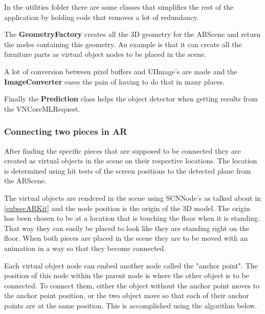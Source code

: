 In the utilities folder there are some classes that simplifies the rest of the application
by holding code that removes a lot of redundancy.

The \textbf{GeometryFactory} creates all the 3D geometry for the ARScene and return the nodes 
containing this geometry. An example is that it can create all the furniture parts as virtual object 
nodes to be placed in the scene.

A lot of conversion between pixel buffers and UIImage's are made and the \textbf{ImageConverter }
eases the pain of having to do that in many places.

Finally the \textbf{Prediction} class helps the object detector when getting results
from the VNCoreMLRequest.

\subsubsection{Connecting two pieces in AR}
After finding the specific pieces that are supposed to be connected they are created as
virtual objects in the scene on their respective locations. The location is determined using
hit tests of the screen positions to the detected plane from the ARScene.

The virtual objects are rendered in the scene using SCNNode's as talked about in \ref{subsecARKit} and the node position is the origin of the 3D model. The origin has been chosen to be at a location that is touching the floor when it is standing. That way they can easily be placed to look like they are standing right on the floor.
When both pieces are placed in the scene they are to be moved with an animation in a way so that they become connected.

Each virtual object node can embed another node called the "anchor point". The position of this node within the parent node is where the other object is to be connected. To connect them, either the object without the anchor point moves to the anchor point position, or the two object move so that each of their anchor points are at the same position.
This is accomplished using the algorithm below.

